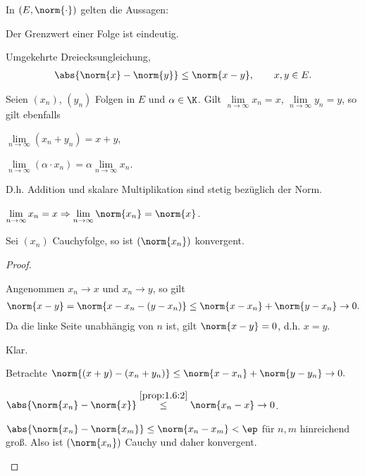 \begin{lem}
\label{prop:1.6}
In $(E,\norm{\cdot})$ gelten die Aussagen:
\begin{propenum}
  \item Der Grenzwert einer Folge ist eindeutig.
  \item\label{prop:1.6:2} Umgekehrte Dreiecksungleichung,
\begin{align*}
\abs{\norm{x}-\norm{y}}\le\norm{x-y},\qquad x,y\in E.
\end{align*}
\item Seien $(x_n)$, $(y_n)$ Folgen in $E$ und $\alpha\in\K$. Gilt
$\lim\limits_{n\to\infty} x_n = x$, $\lim\limits_{n\to\infty} y_n = y$, so gilt
ebenfalls
\begin{equivenum}
  \item $\lim\limits_{n\to\infty} (x_n+y_n) = x+y$,
  \item $\lim\limits_{n\to\infty} (\alpha\cdot x_n) = \alpha\lim\limits_{n\to\infty}
x_n$.
\end{equivenum} 
D.h. Addition und skalare Multiplikation sind stetig bezüglich der Norm.
\item $\lim\limits_{n\to\infty} x_n = x \Rightarrow \lim\limits_{n\to\infty}
\norm{x_n} = \norm{x}$.
\item Sei $(x_n)$ Cauchyfolge, so ist $(\norm{x_n})$ konvergent.\fishhere
\end{propenum}
\end{lem}
\begin{proof}
\begin{proofenum}
  \item Angenommen $x_n\to x$ und $x_n\to y$, so gilt
\begin{align*}
\norm{x-y} = \norm{x-x_n-(y-x_n)} \le \norm{x-x_n} + \norm{y-x_n} \to 0.
\end{align*}
Da die linke Seite unabhängig von $n$ ist, gilt $\norm{x-y}=0$, d.h. $x=y$.
\item Klar.
\item Betrachte $\norm{(x+y)-(x_n+y_n)} \le \norm{x-x_n}+\norm{y-y_n} \to
0.$
\item $\abs{\norm{x_n}-\norm{x}} \overset{\ref{prop:1.6:2}}{\le} \norm{x_n-x}
\to 0$.
\item $\abs{\norm{x_n}-\norm{x_m}} \le \norm{x_n-x_m} < \ep$ für $n,m$
hinreichend groß. Also ist $(\norm{x_n})$ Cauchy und daher konvergent.\qedhere
\end{proofenum}
\end{proof}


